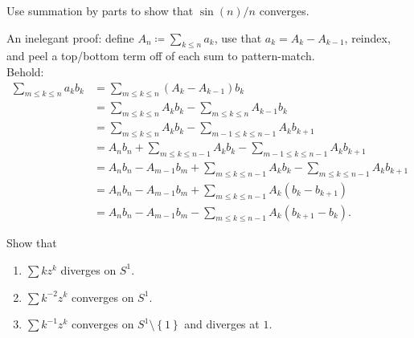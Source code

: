 \begin{exercise}

Use summation by parts to show that \(\sin(n)/n\) converges.

\end{exercise}

\begin{solution}

An inelegant proof: define \(A_n \coloneqq\sum_{k\leq n} a_k\), use that
\(a_k = A_k - A_{k-1}\), reindex, and peel a top/bottom term off of each
sum to pattern-match.\\

Behold:
\begin{align*}
\sum_{m\leq k \leq n} a_k b_k 
&= \sum_{m\leq k \leq n} (A_k - A_{k-1}) b_k \\
&= \sum_{m\leq k \leq n} A_kb_k - \sum_{m\leq k \leq n} A_{k-1} b_k \\
&= \sum_{m\leq k \leq n} A_kb_k - \sum_{m-1\leq k \leq n-1} A_{k} b_{k+1} \\
&= A_nb_n + \sum_{m\leq k \leq n-1} A_kb_k - \sum_{m-1\leq k \leq n-1} A_{k} b_{k+1} \\
&= A_nb_n - A_{m-1} b_{m} + \sum_{m\leq k \leq n-1} A_kb_k - \sum_{m\leq k \leq n-1} A_{k} b_{k+1} \\
&= A_nb_n - A_{m-1} b_{m} + \sum_{m\leq k \leq n-1} A_k(b_k - b_{k+1}) \\
&= A_nb_n - A_{m-1} b_{m} - \sum_{m\leq k \leq n-1} A_k(b_{k+1} - b_{k}) 
.\end{align*}

\end{solution}

\begin{exercise}

Show that

\begin{enumerate}
\def\labelenumi{\arabic{enumi}.}
\tightlist
\item
  \(\sum kz^k\) diverges on \(S^1\).
\item
  \(\sum k^{-2} z^k\) converges on \(S^1\).
\item
  \(\sum k^{-1}z^k\) converges on \(S^1\setminus\left\{{1}\right\}\) and
  diverges at \(1\).
\end{enumerate}

\end{exercise}

